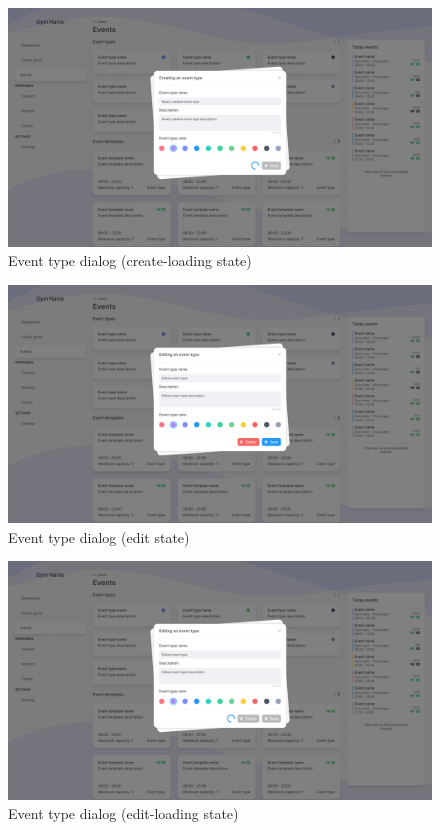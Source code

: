 \documentclass[a4paper, 12pt, oneside]{book}
\begin{document}
\begin{figure}[h!]
	\centering
	\includegraphics[width=\textwidth]{assets/ui/EventTypeCreateLoading.png}
	\caption{Event type dialog (create-loading state)}
\end{figure}
\begin{figure}[h!]
	\centering
	\includegraphics[width=\textwidth]{assets/ui/EventTypeEdit.png}
	\caption{Event type dialog (edit state)}
\end{figure}
\begin{figure}[h!]
	\centering
	\includegraphics[width=\textwidth]{assets/ui/EventTypeEditLoading.png}
	\caption{Event type dialog (edit-loading state)}
\end{figure}
\end{document}
